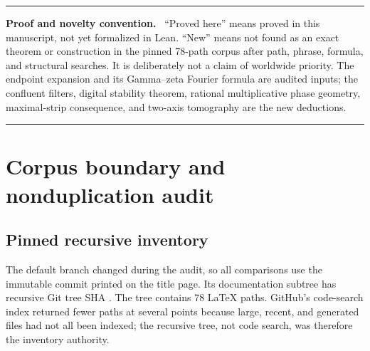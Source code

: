 \documentclass[11pt,oneside]{article}
\numberwithin{equation}{section}
\theoremstyle{definition}
\theoremstyle{remark}
\newenvironment{statusbox}[1]{%
  \par\medskip\noindent\begin{center}\begin{minipage}{0.94\textwidth}%
  \color{DeepBlue}\hrule height 0.8pt\vspace{0.6em}%
  \color{black}\textbf{\color{DeepBlue}#1.}\ }{%
  \par\vspace{0.6em}\color{DeepBlue}\hrule height 0.55pt
  \end{minipage}\end{center}\medskip}
\begin{document}
\begin{abstract}
Fourth, the corpus's exact Gamma--zeta formula for the leading periodic endpoint term is
shown to imply the exact maximal holomorphy strip
\[
 |\Im z|<\frac{\pi}{2\log2}.
\]
Weighted Wiener-algebra bounds then make Bell-polynomial and derivative constructions
quantitatively stable.  Combining radial multiplicative extrapolation with a discrete
Fourier transform over rational phases yields a two-axis tomography algorithm: radial
error is algebraic in the starting Lambert coordinate, while angular aliasing is
exponentially small at the sharp rate $\pi^2/\log2$.

All theorem statements are proved in the report.  Claims about natural boundaries,
optimal span--conditioning tradeoffs, irrational near-locks, and resurgent late-order
behavior are explicitly labeled conjectural.  The accompanying Python program performs
exact rational cancellation checks and high-precision Gamma--zeta experiments and
regenerates every table and figure.
\end{abstract}

\begin{statusbox}{Proof and novelty convention}
``Proved here'' means proved in this manuscript, not yet formalized in Lean.  ``New'' means
not found as an exact theorem or construction in the pinned 78-path corpus after path,
phrase, formula, and structural searches.  It is deliberately not a claim of worldwide
priority.  The endpoint expansion and its Gamma--zeta Fourier formula are audited inputs;
the confluent filters, digital stability theorem, rational multiplicative phase geometry,
maximal-strip consequence, and two-axis tomography are the new deductions.
\end{statusbox}

\tableofcontents
\clearpage

\section{Corpus boundary and nonduplication audit}
\label{sec:audit}

\subsection{Pinned recursive inventory}

The default branch changed during the audit, so all comparisons use the immutable commit
printed on the title page.  Its documentation subtree has recursive Git tree SHA
.  The tree contains 78 LaTeX
paths.  GitHub's code-search index returned fewer paths at several points because large,
recent, and generated files had not all been indexed; the recursive tree, not code search,
was therefore the inventory authority.
\end{document}
